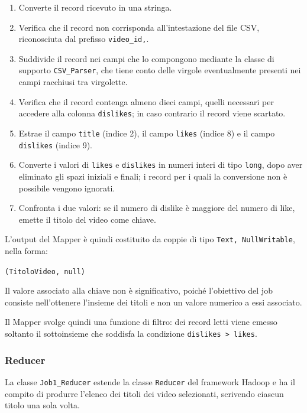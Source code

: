 \documentclass[12pt, a4paper]{article}
\begin{document}
\begin{enumerate}
    \item Converte il record ricevuto in una stringa.
    \item Verifica che il record non corrisponda
    all'intestazione del file CSV, riconosciuta dal
    prefisso \texttt{video\_id,}.
    \item Suddivide il record nei campi che lo
    compongono mediante la classe di supporto
    \texttt{CSV\_Parser}, che tiene conto delle virgole
    eventualmente presenti nei campi racchiusi
    tra virgolette.
    \item Verifica che il record contenga almeno dieci
    campi, quelli necessari per accedere alla colonna
    \texttt{dislikes}; in caso contrario il record
    viene scartato.
    \item Estrae il campo \texttt{title} (indice 2),
    il campo \texttt{likes} (indice 8) e il campo
    \texttt{dislikes} (indice 9).
    \item Converte i valori di \texttt{likes} e
    \texttt{dislikes} in numeri interi di tipo
    \texttt{long}, dopo aver eliminato gli spazi iniziali
    e finali; i record per i quali la conversione
    non è possibile vengono ignorati.
    \item Confronta i due valori: se il numero di dislike
    è maggiore del numero di like, emette
    il titolo del video come chiave.
\end{enumerate}

L'output del Mapper è quindi costituito da
coppie di tipo \texttt{Text, NullWritable},
nella forma:

\begin{center}
    \texttt{(TitoloVideo, null)}
\end{center}

Il valore associato alla chiave non è significativo,
poiché l'obiettivo del job consiste nell'ottenere
l'insieme dei titoli e non un valore numerico
a essi associato.

Il Mapper svolge quindi una funzione di filtro:
dei record letti viene emesso soltanto
il sottoinsieme che soddisfa la condizione
\texttt{dislikes > likes}.

\subsubsection{Reducer}

La classe \texttt{Job1\_Reducer} estende la classe
\texttt{Reducer} del framework Hadoop e ha il compito
di produrre l'elenco dei titoli dei video selezionati,
scrivendo ciascun titolo una sola volta.
\end{document}
